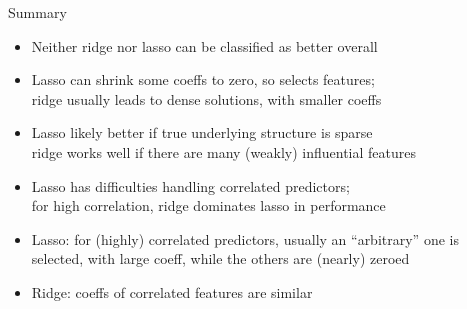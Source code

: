 \documentclass[11pt,compress,t,notes=noshow, xcolor=table]{beamer}
\begin{document}
\begin{vbframe}{Summary  }

\begin{itemize}
\item Neither ridge nor lasso can be classified as better overall
\item Lasso can shrink some coeffs to zero, so selects features; \\
ridge usually leads to dense solutions, with smaller coeffs
\item Lasso likely better if true underlying structure is sparse \\
ridge works well if there are many (weakly) influential features
\item Lasso has difficulties handling correlated predictors; \\
for high correlation, ridge dominates lasso in performance
\item Lasso: for (highly) correlated predictors, usually an ``arbitrary'' one is selected, with large coeff, while the others are (nearly) zeroed
\item Ridge: coeffs of correlated features are similar
\end{itemize}

\end{vbframe}

\endlecture
\end{document}
